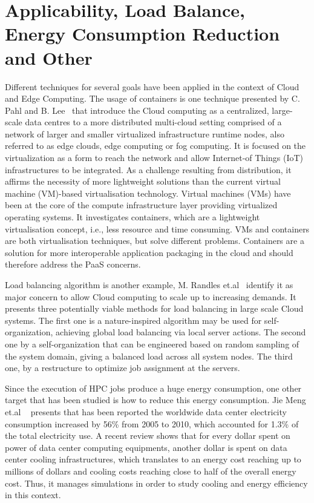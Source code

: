 \section{Applicability, Load Balance, Energy Consumption Reduction and Other}

Different techniques for several goals have been applied in the context of Cloud and Edge Computing. The usage of containers is one technique presented by C. {Pahl} and B. {Lee}~\cite{containers} that introduce the Cloud computing as a centralized, large-scale data centres to a more distributed multi-cloud setting comprised of a network of larger and smaller virtualized infrastructure runtime nodes, also referred to as edge clouds, edge computing or fog computing. It is focused on the virtualization as a form to reach the network and allow Internet-of Things (IoT) infrastructures to be integrated. As a challenge resulting from distribution, it affirms the necessity of more lightweight solutions than the current virtual machine (VM)-based virtualisation technology. Virtual machines (VMs) have been at the core of the compute infrastructure layer providing virtualized operating systems. It investigates containers, which are a lightweight virtualisation concept, i.e., less resource and time consuming. VMs and containers are both virtualisation techniques, but solve different problems. Containers are a solution for more interoperable application packaging in the cloud and should therefore address the PaaS concerns.

Load balancing algorithm is another example, M. {Randles} et.al~\cite{load_balance} identify it as major concern to allow Cloud computing to scale up to increasing demands. It presents three potentially viable methods for load balancing in large scale Cloud systems. The first one is a nature-inspired algorithm may be used for self-organization, achieving global load balancing via local server actions. The second one by a self-organization that can be engineered based on random sampling of the system domain, giving a balanced load across all system nodes. The third one, by a restructure to optimize job assignment at the servers. 

Since the execution of HPC jobs produce a huge energy consumption, one other target that has been studied is how to reduce this energy consumption. Jie Meng et.al ~\cite{simulation_optimization} presents that has been reported the worldwide data center electricity consumption increased by 56\% from 2005 to 2010, which accounted for 1.3\% of the total electricity use. A recent review shows that for every dollar spent on power of data center computing equipments, another dollar is spent on data center cooling infrastructures, which translates to an energy cost reaching up to millions of dollars and cooling costs reaching close to half of the overall energy cost. Thus, it manages simulations in order to study cooling and energy efficiency in this context.

